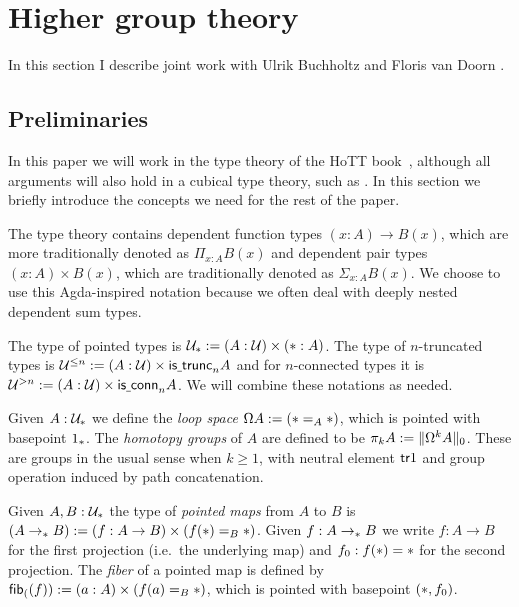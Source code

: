 \chapter{Higher group theory}
In this section I describe joint work with Ulrik Buchholtz and Floris van Doorn \cite{BuchholtzDoornRijke}.

\section{Preliminaries}
\label{sec:preliminaries}

In this paper we will work in the type theory of the HoTT book~\cite{hottbook}, although all arguments will also hold in a cubical type theory, such as \cite{CCHM2016,chtt}. In this section we briefly introduce the concepts we need for the rest of the paper.

The type theory contains dependent function types $(x : A) \to B(x)$, which are more traditionally denoted as $\Pi_{x : A}B(x)$ and dependent pair types $(x : A) \times B(x)$, which are traditionally denoted as $\Sigma_{x : A}B(x)$. We choose to use this Agda-inspired notation because we often deal with deeply nested dependent sum types.

The type of pointed types is
$\UU_\pt := (A : \UU) \times (\pt : A)$. The type of $n$-truncated types is
$\UU^{\le n} := (A : \UU) \times \istrunc{n}{A}$ and for $n$-connected types it is
$\UU^{>n} := (A : \UU) \times \mathsf{is\usc{}conn}_n A$. We will combine these notations as needed.

Given $A:\UU_\pt$ we define the \emph{loop space} $\Omega
A:=(\pt=_A\pt)$, which is pointed with basepoint $1_\pt$. The
\emph{homotopy groups} of $A$ are defined to be $\pi_k A:=
\trunc{0}{\Omega^k A}$. These are groups in the usual sense when
$k\ge1$, with neutral element $\tr{1}$ and group
operation induced by path concatenation.

Given $A,B:\UU_\pt$ the type of \emph{pointed maps} from $A$ to $B$
is $(A\to_\pt B):=(f : A \to B)\times (f(\pt)=_B\pt)$. Given $f:A\to_\pt
B$ we write $f:A\to B$ for the first projection (i.e.~the underlying map) and $f_0:f(\pt)=\pt$ for
the second projection. The \emph{fiber} of a pointed map is defined by
$\fib(f):=(a:A)\times (f(a)=_B\pt)$, which is pointed with basepoint $(\pt,f_0)$.

